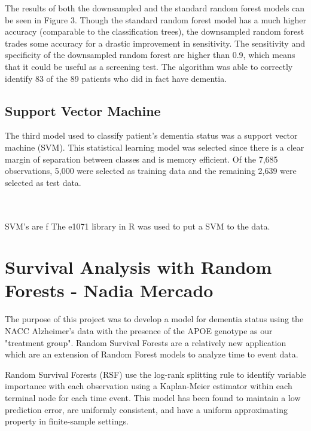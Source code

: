 \documentclass[a4paper,man,natbib,11pt]{article}
\begin{document}
The results of both the downsampled and the standard random forest models can be seen in Figure 3. Though the standard random forest model has a much higher accuracy (comparable to the classification trees), the downsampled random forest trades some accuracy for a drastic improvement in sensitivity. The sensitivity and specificity of the downsampled random forest are higher than 0.9, which means that it could be useful as a screening test. The algorithm was able to correctly identify 83 of the 89 patients who did in fact have dementia.

\subsection{Support Vector Machine}
The third model used to classify patient's dementia status was a support vector machine (SVM). This statistical learning model was selected since there is a clear margin of separation between classes and is  memory efficient. Of the 7,685 observations, 5,000 were selected as training data and the remaining 2,639 were selected as test data. 

\\~\\ SVM's are f
The e1071 library in R was used to put a SVM to the data. 

\section{Survival Analysis with Random Forests - Nadia Mercado}

The purpose of this project was to develop a model for dementia status using the NACC Alzheimer's data with the presence of the APOE genotype as our "treatment group". Random Survival Forests are a relatively new application which are an extension of Random Forest models to analyze time to event data. 

Random Survival Forests (RSF) use the log-rank splitting rule to identify variable importance with each observation using a Kaplan-Meier estimator within each terminal node for each time event. This model has been found to maintain a low prediction error, are uniformly consistent, and have a uniform approximating property in finite-sample settings. 
\end{document}
